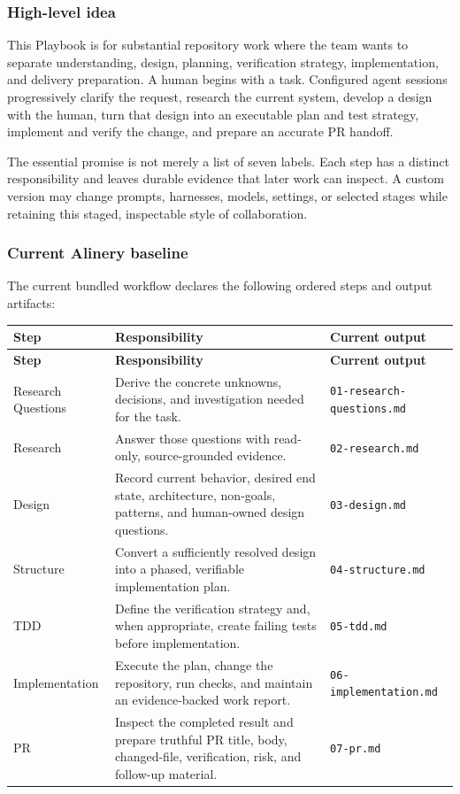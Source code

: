 \documentclass[11pt]{article}
\newcommand{\artifact}[1]{\texttt{#1}}
\begin{document}
\subsubsection{High-level idea}

This Playbook is for substantial repository work where the team wants to separate understanding, design, planning, verification strategy, implementation, and delivery preparation. A human begins with a task. Configured agent sessions progressively clarify the request, research the current system, develop a design with the human, turn that design into an executable plan and test strategy, implement and verify the change, and prepare an accurate PR handoff.

The essential promise is not merely a list of seven labels. Each step has a distinct responsibility and leaves durable evidence that later work can inspect. A custom version may change prompts, harnesses, models, settings, or selected stages while retaining this staged, inspectable style of collaboration.

\subsubsection{Current Alinery baseline}

The current bundled workflow declares the following ordered steps and output artifacts:

\begin{longtable}{@{}L{1.20in}L{2.80in}L{1.90in}@{}}
\toprule
\textbf{Step} & \textbf{Responsibility} & \textbf{Current output} \\
\midrule
\endfirsthead
\toprule
\textbf{Step} & \textbf{Responsibility} & \textbf{Current output} \\
\midrule
\endhead
Research Questions & Derive the concrete unknowns, decisions, and investigation needed for the task. & \artifact{01-research-questions.md} \\
Research & Answer those questions with read-only, source-grounded evidence. & \artifact{02-research.md} \\
Design & Record current behavior, desired end state, architecture, non-goals, patterns, and human-owned design questions. & \artifact{03-design.md} \\
Structure & Convert a sufficiently resolved design into a phased, verifiable implementation plan. & \artifact{04-structure.md} \\
TDD & Define the verification strategy and, when appropriate, create failing tests before implementation. & \artifact{05-tdd.md} \\
Implementation & Execute the plan, change the repository, run checks, and maintain an evidence-backed work report. & \artifact{06-implementation.md} \\
PR & Inspect the completed result and prepare truthful PR title, body, changed-file, verification, risk, and follow-up material. & \artifact{07-pr.md} \\
\bottomrule
\end{longtable}
\end{document}
